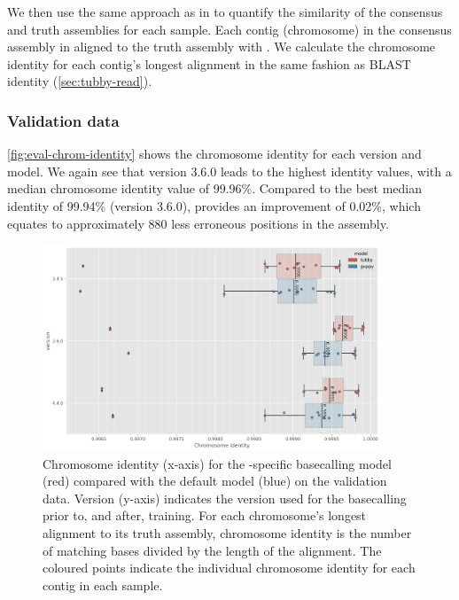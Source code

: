 We then use the same approach as in \cite{wick2020} to quantify the similarity of the consensus and truth assemblies for each sample. Each contig (chromosome) in the consensus assembly in aligned to the truth assembly with . We calculate the chromosome identity for each contig's longest alignment in the same fashion as BLAST identity (\autoref{sec:tubby-read}).

\subsubsection{Validation data}

\autoref{fig:eval-chrom-identity} shows the chromosome identity for each version and model. We again see that \tubby{} version 3.6.0 leads to the highest identity values, with a median chromosome identity value of 99.96\%. Compared to the best median \guppy{} identity of 99.94\% (version 3.6.0), \tubby{} provides an improvement of 0.02\%, which equates to approximately 880 less erroneous positions in the \mtb{} assembly.

\begin{figure}
\includegraphics[width=0.9\textwidth]{Chapter4/Figs/eval_chromosome_identity.png}
\centering
\caption{Chromosome identity (x-axis) for the \mtb{}-specific basecalling model \tubby{} (red) compared with the default \guppy{} model (blue) on the validation data. Version (y-axis) indicates the \guppy{} version used for the basecalling prior to, and after, training. For each chromosome's longest alignment to its truth assembly, chromosome identity is the number of matching bases divided by the length of the alignment. The coloured points indicate the individual chromosome identity for each contig in each sample.}
\label{fig:eval-chrom-identity}
\end{figure}


